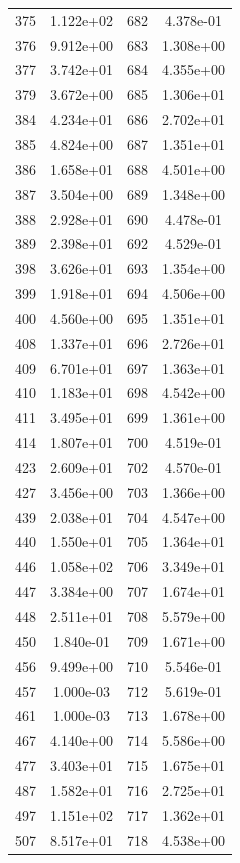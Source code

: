 \documentclass[12pt]{article}
\begin{document}
\begin{longtable}{@{}cccc@{}}
375 & 1.122e+02 & 682 & 4.378e-01 \\
376 & 9.912e+00 & 683 & 1.308e+00 \\
377 & 3.742e+01 & 684 & 4.355e+00 \\
379 & 3.672e+00 & 685 & 1.306e+01 \\
384 & 4.234e+01 & 686 & 2.702e+01 \\
385 & 4.824e+00 & 687 & 1.351e+01 \\
386 & 1.658e+01 & 688 & 4.501e+00 \\
387 & 3.504e+00 & 689 & 1.348e+00 \\
388 & 2.928e+01 & 690 & 4.478e-01 \\
389 & 2.398e+01 & 692 & 4.529e-01 \\
398 & 3.626e+01 & 693 & 1.354e+00 \\
399 & 1.918e+01 & 694 & 4.506e+00 \\
400 & 4.560e+00 & 695 & 1.351e+01 \\
408 & 1.337e+01 & 696 & 2.726e+01 \\
409 & 6.701e+01 & 697 & 1.363e+01 \\
410 & 1.183e+01 & 698 & 4.542e+00 \\
411 & 3.495e+01 & 699 & 1.361e+00 \\
414 & 1.807e+01 & 700 & 4.519e-01 \\
423 & 2.609e+01 & 702 & 4.570e-01 \\
427 & 3.456e+00 & 703 & 1.366e+00 \\
439 & 2.038e+01 & 704 & 4.547e+00 \\
440 & 1.550e+01 & 705 & 1.364e+01 \\
446 & 1.058e+02 & 706 & 3.349e+01 \\
447 & 3.384e+00 & 707 & 1.674e+01 \\
448 & 2.511e+01 & 708 & 5.579e+00 \\
450 & 1.840e-01 & 709 & 1.671e+00 \\
456 & 9.499e+00 & 710 & 5.546e-01 \\
457 & 1.000e-03 & 712 & 5.619e-01 \\
461 & 1.000e-03 & 713 & 1.678e+00 \\
467 & 4.140e+00 & 714 & 5.586e+00 \\
477 & 3.403e+01 & 715 & 1.675e+01 \\
487 & 1.582e+01 & 716 & 2.725e+01 \\
497 & 1.151e+02 & 717 & 1.362e+01 \\
507 & 8.517e+01 & 718 & 4.538e+00 \\

\end{longtable}
\end{document}
